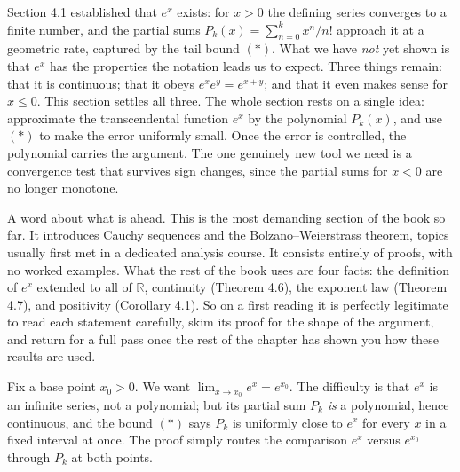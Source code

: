 \documentclass[a4paper,12pt,oneside]{memoir}
\begin{document}
Section 4.1 established that \(e^{x}\) exists: for \(x > 0\) the defining series converges to a finite number, and the partial sums \(P_{k}(x) = \sum_{n=0}^{k} x^{n}/n!\) approach it at a geometric rate, captured by the tail bound \((*)\). What we have \emph{not} yet shown is that \(e^{x}\) has the properties the notation leads us to expect. Three things remain: that it is continuous; that it obeys \(e^{x} e^{y} = e^{x + y}\); and that it even makes sense for \(x \le 0\). This section settles all three. The whole section rests on a single idea: approximate the transcendental function \(e^{x}\) by the polynomial \(P_{k}(x)\), and use \((*)\) to make the error uniformly small. Once the error is controlled, the polynomial carries the argument. The one genuinely new tool we need is a convergence test that survives sign changes, since the partial sums for \(x < 0\) are no longer monotone.

A word about what is ahead. This is the most demanding section of the book so far. It introduces Cauchy sequences and the Bolzano–Weierstrass theorem, topics usually first met in a dedicated analysis course. It consists entirely of proofs, with no worked examples. What the rest of the book uses are four facts: the definition of \(e^{x}\) extended to all of \(\mathbb{R}\), continuity (Theorem 4.6), the exponent law (Theorem 4.7), and positivity (Corollary 4.1). So on a first reading it is perfectly legitimate to read each statement carefully, skim its proof for the shape of the argument, and return for a full pass once the rest of the chapter has shown you how these results are used.

Fix a base point \(x_{0} > 0\). We want \(\lim_{x \to x_{0}} e^{x} = e^{x_{0}}\). The difficulty is that \(e^{x}\) is an infinite series, not a polynomial; but its partial sum \(P_{k}\) \emph{is} a polynomial, hence continuous, and the bound \((*)\) says \(P_{k}\) is uniformly close to \(e^{x}\) for every \(x\) in a fixed interval at once. The proof simply routes the comparison \(e^{x}\) versus \(e^{x_{0}}\) through \(P_{k}\) at both points.
\end{document}
